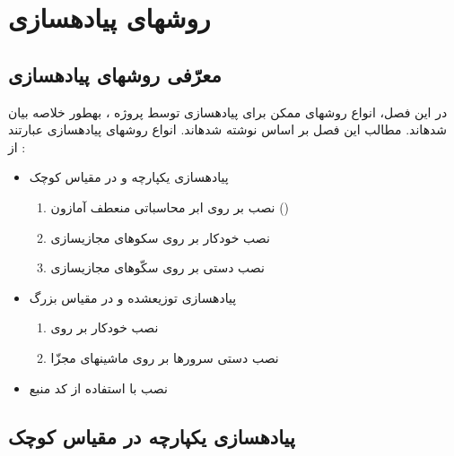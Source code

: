 \chapter{ روش\nf های پیاده\nf سازی}

\section{معرّفی روش\nf های پیاده\nf سازی}

در این فصل، انواع روش\nf های ممکن برای پیاده\nf سازی  توسط پروژه ، به\nf طور خلاصه بیان شده\nf اند. مطالب این فصل بر اساس \cite{webcw} نوشته شده\nf اند. انواع روش\nf های پیاده\nf سازی عبارتند از :
\begin{itemize}
\item پیاده\nf سازی  یکپارچه و در مقیاس کوچک 
\begin{enumerate}
\item نصب بر روی ابر محاسباتی منعطف آمازون ()
\item نصب خودکار بر روی سکوهای مجازی\nf سازی
\item نصب دستی بر روی سکّوهای مجازی\nf سازی  
\end{enumerate}
\item پیاده\nf سازی توزیع\nf شده و در مقیاس بزرگ
\begin{enumerate}
\item  نصب خودکار بر روی  
\item  نصب دستی سرورها بر روی ماشین\nf های مجزّا 
\end{enumerate}
\item نصب با استفاده از کد منبع
\end{itemize}


\section{پیاده\nf سازی یکپارچه در مقیاس کوچک }
